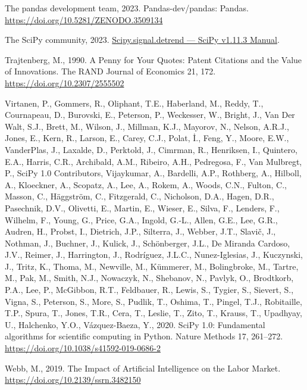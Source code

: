 \documentclass[
  11,
  a4paperpaper,
]{article}
\newlength{\cslhangindent}
\newenvironment{CSLReferences}[2] %
 {\begin{list}{}{%
  \setlength{\itemindent}{0pt}
  \setlength{\leftmargin}{0pt}
  \setlength{\parsep}{0pt}
  \ifodd #1
   \setlength{\leftmargin}{\cslhangindent}
   \setlength{\itemindent}{-1\cslhangindent}
  \fi
  \setlength{\itemsep}{#2\baselineskip}}}
 {\end{list}}
\begin{document}
\begin{CSLReferences}{1}{0}
The pandas development team, 2023. Pandas-dev/pandas: {Pandas}.
\url{https://doi.org/10.5281/ZENODO.3509134}

The SciPy community, 2023.
\href{https://docs.scipy.org/doc/scipy/reference/generated/scipy.signal.detrend.html}{Scipy.signal.detrend
--- {SciPy} v1.11.3 {Manual}}.

Trajtenberg, M., 1990. A {Penny} for {Your} {Quotes}: {Patent}
{Citations} and the {Value} of {Innovations}. The RAND Journal of
Economics 21, 172. \url{https://doi.org/10.2307/2555502}

Virtanen, P., Gommers, R., Oliphant, T.E., Haberland, M., Reddy, T.,
Cournapeau, D., Burovski, E., Peterson, P., Weckesser, W., Bright, J.,
Van Der Walt, S.J., Brett, M., Wilson, J., Millman, K.J., Mayorov, N.,
Nelson, A.R.J., Jones, E., Kern, R., Larson, E., Carey, C.J., Polat, İ.,
Feng, Y., Moore, E.W., VanderPlas, J., Laxalde, D., Perktold, J.,
Cimrman, R., Henriksen, I., Quintero, E.A., Harris, C.R., Archibald,
A.M., Ribeiro, A.H., Pedregosa, F., Van Mulbregt, P., SciPy 1.0
Contributors, Vijaykumar, A., Bardelli, A.P., Rothberg, A., Hilboll, A.,
Kloeckner, A., Scopatz, A., Lee, A., Rokem, A., Woods, C.N., Fulton, C.,
Masson, C., Häggström, C., Fitzgerald, C., Nicholson, D.A., Hagen, D.R.,
Pasechnik, D.V., Olivetti, E., Martin, E., Wieser, E., Silva, F.,
Lenders, F., Wilhelm, F., Young, G., Price, G.A., Ingold, G.-L., Allen,
G.E., Lee, G.R., Audren, H., Probst, I., Dietrich, J.P., Silterra, J.,
Webber, J.T., Slavič, J., Nothman, J., Buchner, J., Kulick, J.,
Schönberger, J.L., De Miranda Cardoso, J.V., Reimer, J., Harrington, J.,
Rodríguez, J.L.C., Nunez-Iglesias, J., Kuczynski, J., Tritz, K., Thoma,
M., Newville, M., Kümmerer, M., Bolingbroke, M., Tartre, M., Pak, M.,
Smith, N.J., Nowaczyk, N., Shebanov, N., Pavlyk, O., Brodtkorb, P.A.,
Lee, P., McGibbon, R.T., Feldbauer, R., Lewis, S., Tygier, S., Sievert,
S., Vigna, S., Peterson, S., More, S., Pudlik, T., Oshima, T., Pingel,
T.J., Robitaille, T.P., Spura, T., Jones, T.R., Cera, T., Leslie, T.,
Zito, T., Krauss, T., Upadhyay, U., Halchenko, Y.O., Vázquez-Baeza, Y.,
2020. {SciPy} 1.0: Fundamental algorithms for scientific computing in
{Python}. Nature Methods 17, 261--272.
\url{https://doi.org/10.1038/s41592-019-0686-2}

Webb, M., 2019. The {Impact} of {Artificial} {Intelligence} on the
{Labor} {Market}. \url{https://doi.org/10.2139/ssrn.3482150}

\end{CSLReferences}
\end{document}
